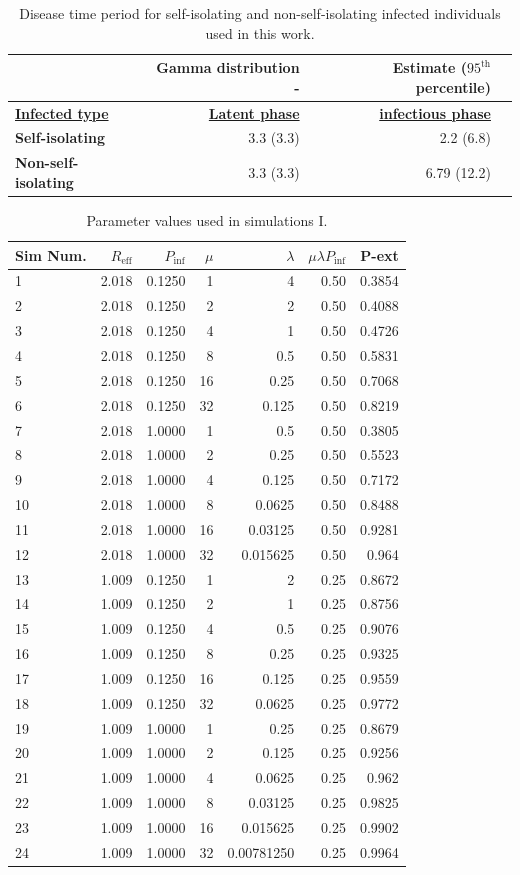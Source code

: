 \documentclass[sr]{drdc-report}
\def\Reff{\ensuremath{R_\mathrm{eff}}}
\def\Pinf{\ensuremath{P_\mathrm{inf}}}
\def\nfpc{\ensuremath{95^\mathrm{th}}}
\begin{document}
\begin{table}
\centering
\caption{Disease time period for self-isolating and non-self-isolating infected individuals used in this work.}\label{table_diseasePhase}
\begin{tabular}{lrrl}
& Gamma distribution {   } - &Estimate (\nfpc\ percentile)\\
\hline
\textbf{\underline{Infected type}} & \textbf{\underline{Latent phase}} & \textbf{\underline{infectious phase}}\\
\textbf{Self-isolating} & 3.3 (3.3) & 2.2 (6.8)\\
\textbf{Non-self-isolating} & 3.3 (3.3) & 6.79 (12.2)\\
\hline
\end{tabular}
\end{table}

\begin{table}
\centering
\caption{Parameter values used in simulations I.}\label{table_simIparams}
\begin{tabular}{lrrrrrr}
Sim Num. &	\Reff	& \Pinf &	$\mu$ &	$\lambda$ & $\mu\lambda\Pinf$	 & P-ext\\
\hline
1&	2.018&	0.1250&	1&	4	&0.50&0.3854\\
2	&2.018&	0.1250&	2&	2	&0.50&0.4088\\
3&	2.018&	0.1250&	4&	1	&0.50&0.4726\\
4&	2.018&	0.1250&	8&	0.5	&0.50&0.5831\\
5&	2.018&	0.1250&	16&	0.25&	0.50&0.7068\\
6&	2.018&	0.1250&	32	&0.125&	0.50&0.8219\\
7&	2.018&	1.0000&	1&	0.5	&0.50&0.3805\\
8&	2.018&	1.0000	&2&	0.25&	0.50&0.5523\\
9&	2.018&	1.0000	&4	&0.125&	0.50&0.7172\\
10&	2.018&	1.0000	&8	&0.0625	&0.50&0.8488\\
11&	2.018&	1.0000	&16	&0.03125&	0.50&0.9281\\
12&	2.018&	1.0000	&32	&0.015625&	0.50&0.964\\
\hline
13&	1.009&	0.1250&	1&	2&	0.25& 0.8672 \\
14&	1.009&	0.1250&	2&	1&	0.25&0.8756\\
15&	1.009&	0.1250&	4&	0.5&	0.25&0.9076\\
16&	1.009&	0.1250&	8&	0.25&	0.25&0.9325\\
17&	1.009&	0.1250&	16&	0.125&	0.25&0.9559 \\
18&	1.009&	0.1250&	32&	0.0625&	0.25&0.9772\\
19&	1.009&	1.0000&	1&	0.25&	0.25&0.8679\\
20&	1.009&	1.0000&	2&	0.125&	0.25&0.9256\\
21&	1.009&	1.0000&	4&	0.0625&	0.25&0.962\\
22&	1.009&	1.0000&	8&	0.03125&	0.25&0.9825\\
23&	1.009&	1.0000&	16&	0.015625&	0.25&0.9902\\
24&	1.009&	1.0000&	32	&0.00781250&	0.25&0.9964\\
\hline
\end{tabular}
\end{table}
\end{document}
